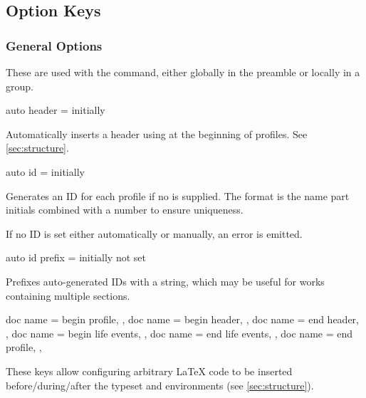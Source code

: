 \documentclass[
	a4paper,
]{article}
\begin{document}
\subsection{Option Keys} %

\subsubsection{General Options} %

\label{sec:genconf}
These are used with the  command, either globally in the preamble or locally in a group.

\begin{docKey}
	{auto header}
	{=}
	{initially }

	Automatically inserts a header using  at the beginning of profiles. See \cref{sec:structure}.
\end{docKey}

\begin{docKey}
	{auto id}
	{=}
	{initially }

	Generates an ID for each profile if no  is supplied. The format is the name part initials combined with a number to ensure uniqueness.

	If no ID is set either automatically or manually, an error is emitted.
\end{docKey}

\begin{docKey}
	{auto id prefix}
	{=}
	{initially not set}

	Prefixes auto-generated IDs with a string, which may be useful for works containing multiple sections.
\end{docKey}

\begin{docKeys}
	[
		doc parameter = {=\meta{...}},
		doc description = {initially not set},
	]
	{
		{
			doc name = begin profile,
		},
		{
			doc name = begin header,
		},
		{
			doc name = end header,
		},
		{
			doc name = begin life events,
		},
		{
			doc name = end life events,
		},
		{
			doc name = end profile,
		},
	}

	These keys allow configuring arbitrary \LaTeX{} code to be inserted before/during/after the typeset  and  environments (see \cref{sec:structure}).

\end{docKeys}
\end{document}

